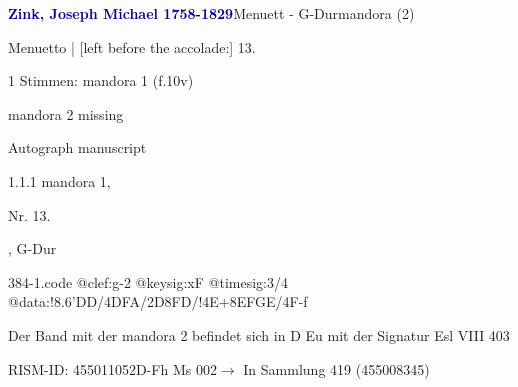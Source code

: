 \documentclass[twocolumn, 12pt]{book}
\begin{document}
\par \vspace{16pt} \textcolor{darkblue}{\textbf{Zink, Joseph Michael  1758-1829}}\hfillplus{\textbf{[384]}}\newline Menuett - G-Dur\newline mandora (2)
\par \begin{itshape}[f.10v, at left:] Menuetto | [left before the accolade:] 13.\end{itshape} 
\par \textcolor{darkblue}{}  1 Stimmen: mandora 1  (f.10v)\newline \begin{small} mandora 2 missing\end{small} \newline Autograph manuscript
\par 1.1.1  mandora 1, \begin{itshape}Nr. 13.\end{itshape}, G-Dur  
\begin{filecontents*}{384-1.code}
@clef:g-2
@keysig:xF
@timesig:3/4
@data:!{8.6'DD}/4DFA/2D{8FD}/!4E+{8EFGE}/4F-f
\end{filecontents*}
\newline %
\par Der Band mit der mandora 2 befindet sich in D Eu mit der Signatur Esl VIII 403
\par RISM-ID: 455011052\newline D-Fh  Ms 002\newline $\rightarrow$ In Sammlung 419 (455008345)
      
\end{document}
